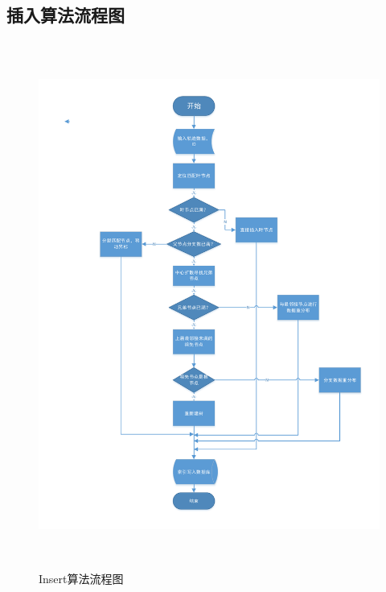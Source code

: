 \subsection{插入算法流程图}
\begin{figure}[H]
  \centering
  \includegraphics[width=6in,height=6.8in]{new_FIGs/chapter4/vp-tree-insert-flow.pdf}
  \caption{Insert算法流程图}\label{vp-tree-insert-flow}
\end{figure}
